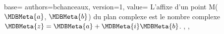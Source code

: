 {
  base={
    authors={bchanceaux},
    version={1},
    value={%
      L'affixe d'un point M($\MDBMeta{a}$, $\MDBMeta{b}$)
      du plan complexe est le nombre complexe
      $\MDBMeta{z} = \MDBMeta{a} + \MDBMeta{i} \MDBMeta{b}$.%
    },
  },
}
